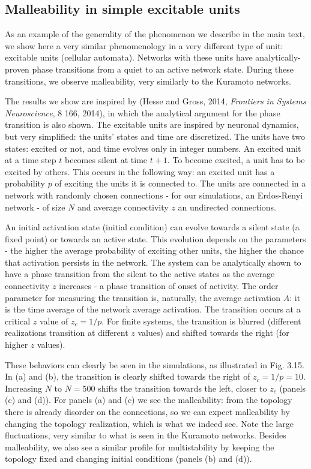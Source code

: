 \subsection*{Malleability in simple excitable units}
As an example of the generality of the phenomenon we describe in the main text, we show here a very similar phenomenology in a very different type of unit: excitable units (cellular automata). Networks with these units have analytically-proven phase transitions from a quiet to an active network state. During these transitions, we observe malleability, very similarly to the Kuramoto networks. 

The results we show are inspired by (Hesse and Gross, 2014, \textit{Frontiers in Systems Neuroscience}, 8 166, 2014), in which the analytical argument for the phase transition is also shown.
The excitable units are inspired by neuronal dynamics, but very simplified: the units' states and time are discretized. The units have two states: excited or not, and time evolves only in integer numbers. An excited unit at a time step $t$ becomes silent at time $t+1$. To become excited, a unit has to be excited by others. This occurs in the following way: an excited unit has a probability $p$ of exciting the units it is connected to. The units are connected in a network with randomly chosen connections - for our simulations, an Erdos-Renyi network - of size $N$ and average connectivity $z$ an undirected connections. 

An initial activation state (initial condition) can evolve towards a silent state (a fixed point) or towards an active state. This evolution depends on the parameters - the higher the average probability of exciting other units, the higher the chance that activation persists in the network.  The system can be analytically shown to have a phase transition from the silent to the active states as the average connectivity $z$ increases - a phase transition of onset of activity. The order parameter for measuring the transition is, naturally, the average activation $A$: it is the time average of the network average activation. The transition occurs at a critical $z$ value of $z_c = 1/p$. For finite systems, the transition is blurred (different realizations transition at different $z$ values) and shifted towards the right (for higher $z$ values). 

These behaviors can clearly be seen in the simulations, as illustrated in Fig. 3.15. In (a) and (b), the transition is clearly shifted towards the right of $z_c = 1/p = 10$. Increasing $N$ to $N = 500$ shifts the transition towards the left, closer to $z_c$ (panels (c) and (d)). For panels (a) and (c) we see the malleability: from the topology there is already disorder on the connections, so we can expect malleability by changing the topology realization, which is what we indeed see. Note the large fluctuations, very similar to what is seen in the Kuramoto networks. Besides malleability, we also see a similar profile for multistability by keeping the topology fixed and changing initial conditions (panels (b) and (d)).


